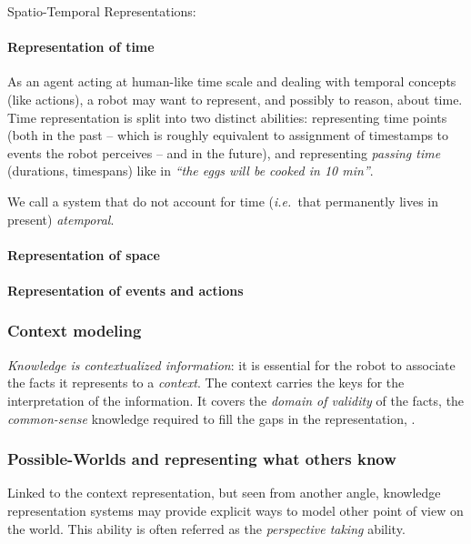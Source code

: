\documentclass[a4paper, twocolumn]{article}
\newcommand{\ie}{{\textit{i.e.~}}}
\begin{document}
Spatio-Temporal Representations:

\paragraph{Representation of time}

As an agent acting at human-like time scale and dealing with temporal concepts
(like actions), a robot may want to represent, and possibly to reason, about
time. Time representation is split into two distinct abilities: representing
time points (both in the past -- which is roughly equivalent to assignment of
timestamps to events the robot perceives -- and in the future), and
representing \emph{passing time} (durations, timespans) like in \emph{``the
eggs will be cooked in 10 min''}.


We call a system that do not account for time (\ie that permanently lives in
present) \emph{atemporal}.

\paragraph{Representation of space}

\paragraph{Representation of events and actions}

\subsubsection{Context modeling}

\emph{Knowledge is contextualized information}: it is essential for the robot to associate the facts it
represents to a \emph{context}. The context carries the keys for the
interpretation of the information. It covers the \emph{domain of validity} of
the facts, the \emph{common-sense} knowledge required to fill the gaps in the
representation, .

\subsubsection{Possible-Worlds and representing what others know}
\label{sect|possible-worlds}

    
Linked to the context representation, but seen from another angle, knowledge
representation systems may provide explicit ways to model other point of view
on the world. This ability is often referred as the \emph{perspective taking}
ability.
\end{document}
